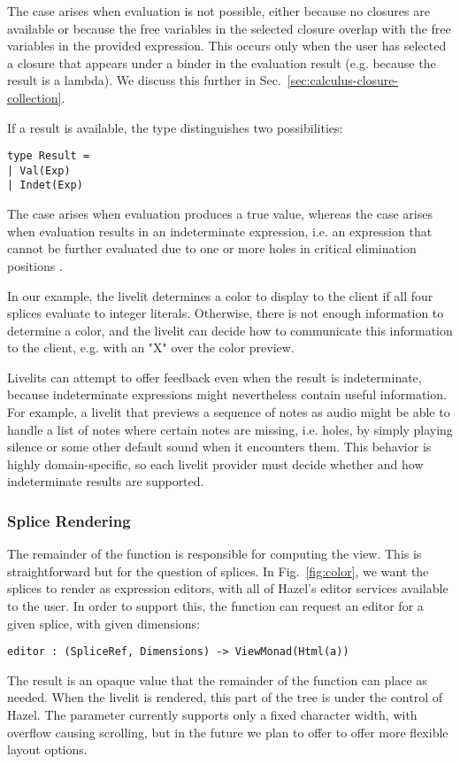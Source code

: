 The  case 
arises when evaluation is not possible, either because no closures are available
or because the free variables in the selected closure overlap with the free 
variables in the provided expression. This occurs only when the user has selected
a closure that appears under a binder in the evaluation result (e.g. because 
the result is a lambda). 
We discuss this further in Sec.~\ref{sec:calculus-closure-collection}.

If a result is available, the  type distinguishes two possibilities:
\begin{lstlisting}[numbers=none]
type Result = 
| Val(Exp)
| Indet(Exp)
\end{lstlisting}
The  case arises when evaluation produces a true value, whereas the 
 case arises when evaluation results in an indeterminate expression,
i.e. an expression that cannot be further evaluated due to one or more holes 
in critical elimination positions \cite{HazelnutLive}.

In our example, the livelit determines a color to display to the client 
if all four splices evaluate to integer literals. Otherwise, there is not 
enough information to determine a color, and the livelit can decide how to 
communicate this information to the client, e.g. with an "X" over the color 
preview.

Livelits can attempt to offer feedback even when the result is indeterminate,
because indeterminate expressions might nevertheless contain useful information.
For example, a livelit that previews a sequence of notes as audio might be able 
to handle a list of notes where certain notes are missing, i.e. holes, by 
simply playing silence or some other default sound when it encounters them.
This behavior is highly domain-specific, so each livelit provider must decide 
whether and how indeterminate results are supported.

\subsubsection{Splice Rendering}
The remainder of the  function is responsible for computing the view.
This is straightforward but for the question of splices. In Fig.~\ref{fig:color},
we want the splices to render as expression editors, with all of Hazel's editor 
services available to the user. In order to support this, the  function
can request an editor for a given splice, with given dimensions:
\begin{lstlisting}[numbers=none]
editor : (SpliceRef, Dimensions) -> ViewMonad(Html(a))
\end{lstlisting}
The result is an opaque  value that the remainder of the function 
can place as needed. When the livelit is rendered, this part of the tree is 
under the control of Hazel. The  parameter currently supports only a fixed
character width, with overflow causing scrolling, but in the future we plan to offer 
to offer more flexible layout options.

